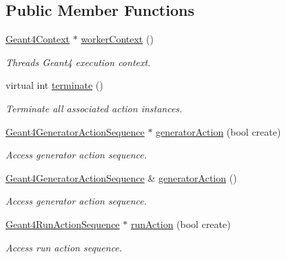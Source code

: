 \subsection*{Public Member Functions}
\begin{DoxyCompactItemize}
\item 
\hyperlink{class_d_d4hep_1_1_simulation_1_1_geant4_context}{Geant4\+Context} $\ast$ \hyperlink{class_d_d4hep_1_1_simulation_1_1_geant4_action_container_a6fe45521592147fe47d7cc545add8ca0}{worker\+Context} ()
\begin{DoxyCompactList}\small\item\em Thread\textquotesingle{}s Geant4 execution context. \end{DoxyCompactList}\item 
virtual int \hyperlink{class_d_d4hep_1_1_simulation_1_1_geant4_action_container_ad9cfc3e1bc35d384f5dbd4e8747ddf69}{terminate} ()
\begin{DoxyCompactList}\small\item\em Terminate all associated action instances. \end{DoxyCompactList}\item 
\hyperlink{class_d_d4hep_1_1_simulation_1_1_geant4_generator_action_sequence}{Geant4\+Generator\+Action\+Sequence} $\ast$ \hyperlink{class_d_d4hep_1_1_simulation_1_1_geant4_action_container_aac0430d56fb1bc7db0b71720c49033a4}{generator\+Action} (bool create)
\begin{DoxyCompactList}\small\item\em Access generator action sequence. \end{DoxyCompactList}\item 
\hyperlink{class_d_d4hep_1_1_simulation_1_1_geant4_generator_action_sequence}{Geant4\+Generator\+Action\+Sequence} \& \hyperlink{class_d_d4hep_1_1_simulation_1_1_geant4_action_container_a1c16fc087f37dc5350691bcc89a7a40e}{generator\+Action} ()
\begin{DoxyCompactList}\small\item\em Access generator action sequence. \end{DoxyCompactList}\item 
\hyperlink{class_d_d4hep_1_1_simulation_1_1_geant4_run_action_sequence}{Geant4\+Run\+Action\+Sequence} $\ast$ \hyperlink{class_d_d4hep_1_1_simulation_1_1_geant4_action_container_a5ce39c42386a93c9e446d8651495c11e}{run\+Action} (bool create)
\begin{DoxyCompactList}\small\item\em Access run action sequence. \end{DoxyCompactList}\item 

\end{DoxyCompactItemize}

